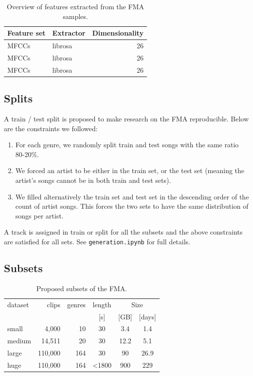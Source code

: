 \documentclass{article}
\begin{document}
\begin{table}
	\centering
	\begin{tabular}{llr}
		\toprule
		Feature set & Extractor & Dimensionality \\
		\midrule
		MFCCs \cite{mfcc} & librosa & 26 \\
		MFCCs \cite{mfcc} & librosa & 26 \\
		MFCCs \cite{mfcc} & librosa & 26 \\
		\bottomrule
	\end{tabular}
	\caption{Overview of features extracted from the FMA samples.}
	\label{tab:features}
\end{table}

\subsection{Splits}

A train / test split is proposed to make research on the FMA reproducible.
Below are the constraints we followed:
\begin{enumerate}
	\item For each genre, we randomly split train and test songs with the same ratio 80-20\%.
	\item We forced an artist to be either in the train set, or the test set (meaning the artist's songs cannot be in both train and test sets).
	\item We filled alternatively the train set and test set in the descending order of the count of artist songs. This forces the two sets to have the same distribution of songs per artist.
\end{enumerate}
A track is assigned in train or split for all the subsets and the above constraints are satisfied for all sets. See \texttt{generation.ipynb} for full details.

\subsection{Subsets} \label{sec:subsets}

\begin{table}
	\centering
	\begin{tabular}{lrrccc}
		\toprule
		dataset & clips & genres & length & \multicolumn{2}{c}{Size} \\
		\cmidrule{5-6}
		        &         &          &  [s]   & [GB] & [days] \\
		\midrule
		small  &   4,000 & 10  & 30    & 3.4  & 1.4  \\
		medium &  14,511 & 20  & 30    & 12.2 & 5.1  \\
		large  & 110,000 & 164 & 30    & 90   & 26.9 \\
		huge   & 110,000 & 164 & <1800 & 900  & 229  \\
		\bottomrule
	\end{tabular}
	\caption{Proposed subsets of the FMA.}
	\label{tab:subsets}
\end{table}
\end{document}
